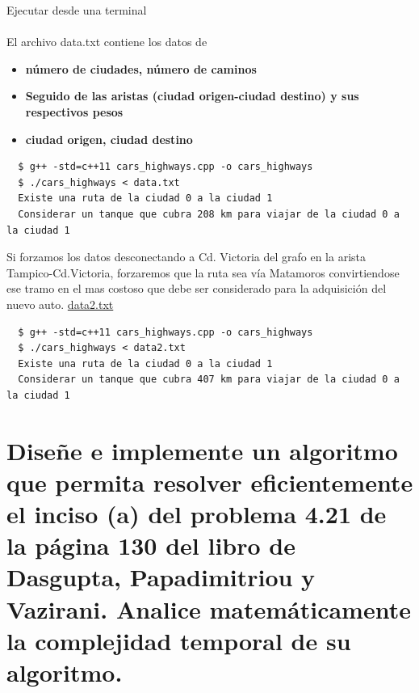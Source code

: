 \documentclass{article}
\begin{document}
Ejecutar desde una terminal\\\\

El archivo data.txt contiene los datos de
\begin{itemize}
\item \textbf{número de ciudades, número de caminos}
\item \textbf{Seguido de las aristas (ciudad origen-ciudad destino) y sus respectivos pesos}
\item \textbf{ciudad origen, ciudad destino}
\end{itemize}

\begin{commandline}
\begin{verbatim}
  $ g++ -std=c++11 cars_highways.cpp -o cars_highways
  $ ./cars_highways < data.txt
  Existe una ruta de la ciudad 0 a la ciudad 1
  Considerar un tanque que cubra 208 km para viajar de la ciudad 0 a la ciudad 1
\end{verbatim}
\end{commandline}

Si forzamos los datos desconectando a Cd. Victoria del grafo en la arista Tampico-Cd.Victoria, forzaremos que la ruta sea vía Matamoros convirtiendose ese tramo en el mas costoso que debe ser considerado para la adquisición del nuevo auto. \href{https://github.com/luisballado/ADA/blob/main/practice_code/tarea5/currency_trading/data.txt}{data2.txt}\\

\begin{commandline}
\begin{verbatim}
  $ g++ -std=c++11 cars_highways.cpp -o cars_highways
  $ ./cars_highways < data2.txt
  Existe una ruta de la ciudad 0 a la ciudad 1
  Considerar un tanque que cubra 407 km para viajar de la ciudad 0 a la ciudad 1
\end{verbatim}
\end{commandline}


\newpage
\section{Diseñe e implemente un algoritmo que permita resolver eficientemente el inciso (a) del problema 4.21 de la página 130 del libro de Dasgupta, Papadimitriou y Vazirani. Analice matemáticamente la complejidad temporal de su algoritmo.}
\end{document}
